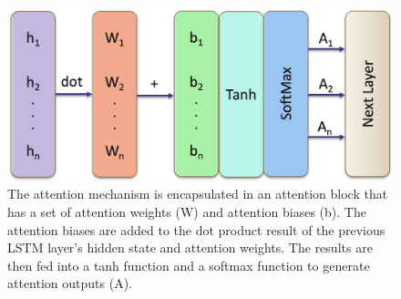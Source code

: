 \documentclass[sigconf,authorversion]{acmart}
\begin{document}
\begin{figure}[h]
  \centering
  \includegraphics[width=\linewidth]{attention_mec.png}
  \caption{The attention mechanism is encapsulated in an attention block that has
  a set of attention weights (W) and attention biases (b). The attention biases are
  added to the dot product result of the previous LSTM layer's hidden state and 
  attention weights. The results are then fed into a tanh function and a softmax
  function to generate attention outputs (A).}
  \label{attention_mechanism}
\end{figure}
\end{document}
